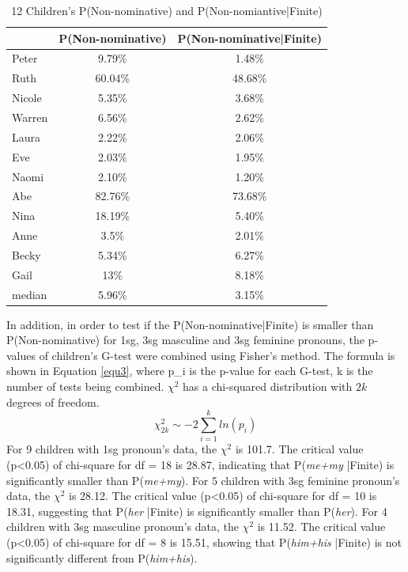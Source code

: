 \FloatBarrier
\begin{table}[h]
\centering
\caption{12 Children's P(Non-nominative) and P(Non-nomiantive|Finite)}
\label{tab: Pnon}
\begin{tabular}{l|cc}
\toprule
 & P(Non-nominative) & P(Non-nominative|Finite) \\
 \hline
Peter & 9.79\% & 1.48\% \\
Ruth & 60.04\% & 48.68\% \\
Nicole & 5.35\% & 3.68\% \\
Warren & 6.56\% & 2.62\% \\
Laura & 2.22\% & 2.06\% \\
Eve & 2.03\% & 1.95\% \\
Naomi & 2.10\% & 1.20\% \\
Abe & 82.76\% & 73.68\% \\
Nina & 18.19\% & 5.40\% \\
Anne & 3.5\% & 2.01\% \\
Becky & 5.34\% & 6.27\% \\
Gail & 13\% & 8.18\% \\
\hline
median & 5.96\% & 3.15\%\\
\bottomrule
\end{tabular}
\end{table}
\FloatBarrier
In addition, in order to test if the P(Non-nominative|Finite) is smaller than P(Non-nominative) for 1sg, 3sg masculine and 3sg feminine pronouns, the p-values of children's G-test were combined using Fisher's method. The formula is shown in Equation \ref{equ3}, where p_i is the p-value for each G-test, k is the number of tests being combined. $\chi^2$ has a chi-squared distribution with $2k$ degrees of freedom.
\begin{equation}
\label{equ3}
    \chi^2_{2k} \sim -2\displaystyle\sum^k_{i=1}ln(p_i)
\end{equation}
For 9 children with 1sg pronoun's data, the $\chi^2$ is 101.7. The critical value (p<0.05) of chi-square for df = 18 is 28.87, indicating that P(\textit{me+my }|Finite) is significantly smaller than P(\textit{me+my}). For 5 children with 3sg feminine pronoun's data, the $\chi^2$ is 28.12. The critical value (p<0.05) of chi-square for df = 10 is 18.31, suggesting that P(\textit{her }|Finite) is significantly smaller than P(\textit{her}). For 4 children with 3sg masculine pronoun's data, the $\chi^2$ is 11.52. The critical value (p<0.05) of chi-square for df = 8 is 15.51, showing that P(\textit{him+his }|Finite) is not significantly different from P(\textit{him+his}). 


